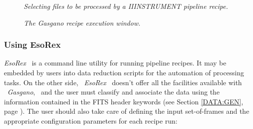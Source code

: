 \begin{figure}[h]
\begin{center}
\end{center}
\caption{\it Selecting files to be processed by a IIINSTRUMENT pipeline recipe.}
\label{GAS_SEL}
\end{figure}

\begin{figure}[h]
\begin{center}
\end{center}
\caption{\it The Gasgano recipe execution window.}
\label{GAS_REC}
\end{figure}

\clearpage




\subsubsection{Using EsoRex}
\label{ESOREX}

{\it EsoRex} \ is a command line utility for running pipeline recipes. 
It may be embedded by users into data reduction scripts for the automation 
of processing tasks. On the other side, \ {\it EsoRex} \ doesn't offer 
all the facilities available with \ {\it Gasgano}, \ and the user must 
classify and associate the data using the information contained in 
the FITS header keywords (see Section \ref{DATA:GEN}, 
page \pageref{DATA:GEN}). 
The user should also take care of defining the input set-of-frames and 
the appropriate configuration parameters for each recipe run:

